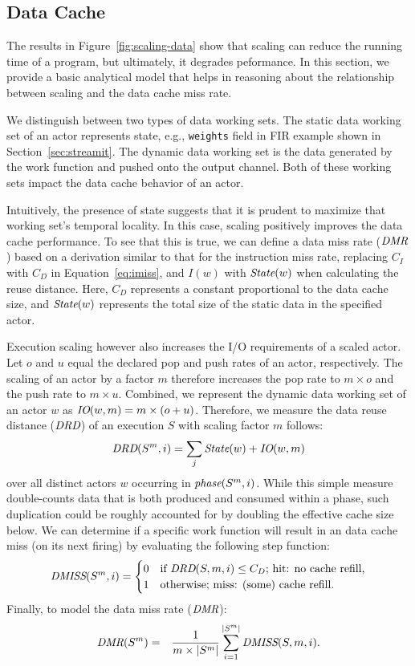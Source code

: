 \subsection{Data Cache}

The results in Figure~\ref{fig:scaling-data} show that scaling can
reduce the running time of a program, but ultimately, it degrades
peformance. In this section, we provide a basic analytical model that
helps in reasoning about the relationship between scaling and the data
cache miss rate. 

We distinguish between two types of data working sets. The static data
working set of an actor represents state, e.g., \texttt{weights} field
in FIR example shown in Section~\ref{sec:streamit}.  The dynamic data
working set is the data generated by the work function and pushed onto
the output channel. Both of these working sets impact the data cache
behavior of an actor.

Intuitively, the presence of state suggests that it is
prudent to maximize that working set's temporal locality. In this
case, scaling positively improves the data cache performance. To see
that this is true, we can define a data miss rate ($\mbox{\it DMR}$) based on
a derivation similar to that for the instruction miss rate, replacing
$C_I$ with $C_D$ in Equation~\ref{eq:imiss}, and $I(w)$ with
$\mbox{\it State}(w)$ when calculating the reuse distance. Here, $C_D$
represents a constant proportional to the data cache size, and
$\mbox{\it State}(w)$ represents the total size of the static data in the
specified actor. 

Execution scaling however also increases the I/O requirements of a
scaled actor. Let $o$ and $u$ equal the declared pop and push rates
of an actor, respectively.  The scaling of an
actor by a factor $m$ therefore increases the pop rate to $m\times o$
and the push rate to $m\times u$. Combined, we represent the dynamic
data working set of an actor $w$ as $\mbox{\it IO}(w, m) =
m\times(o+u)$. Therefore, we measure the data reuse distance ($\mbox{\it DRD}$)
of an execution $S$ with scaling factor $m$ follows:
\[
  \mbox{\it DRD}(S^m,i)=\sum_{j} \mbox{\it State}(w) + \mbox{\it IO}(w,m)
\]
over all distinct actors $w$ occurring in $\mbox{\it phase}(S^m,i)$.  While
this simple measure double-counts data that is both produced and
consumed within a phase, such duplication could be roughly accounted
for by doubling the effective cache size below.  We can determine if a
specific work function will result in an data cache miss (on its next
firing) by evaluating the following step function:
\begin{equation}
\label{eq:dmiss}
  \mbox{\it DMISS}(S^m,i) =
    \begin{cases}
      0& \text{if $\mbox{\it DRD}(S,m,i) \leq C_D$; hit: no cache refill,}\\
      1& \text{otherwise; miss: (some) cache refill.}
    \end{cases}
\end{equation}
Finally, to model the data miss rate ($\mbox{\it DMR}$):
\begin{eqnarray}
  \label{eq:dmrM}
  \mbox{\it DMR}(S^m) &=& \frac{1}{m \times |S^m|}\sum_{i=1}^{|S^m|} \mbox{\it DMISS}(S,m,i).
\end{eqnarray}

